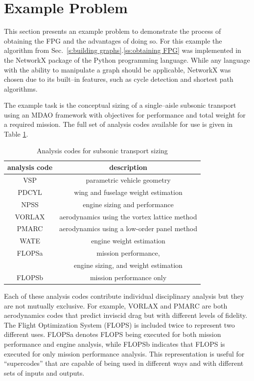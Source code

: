 \section{Example Problem}
	\label{s:example problem}
	This section presents an example problem to demonstrate the process of obtaining the FPG and the advantages of doing so. 
	For this example the algorithm from Sec.~\ref{s:building graphs}.\ref{ss:obtaining FPG} was implemented in the NetworkX package of the Python programming language. 
	While any language with the ability to manipulate a graph should be applicable, NetworkX was chosen due to its built--in features, such as cycle detection and shortest path algorithms.

	The example task is the conceptual sizing of a single--aisle subsonic transport using an MDAO framework with objectives for performance and total weight for a required mission. 
	The full set of analysis codes available for use is given in Table \ref{t:analysis codes}.
	\begin{table}[htbp]
	  \centering
	  \caption{Analysis codes for subsonic transport sizing}
		\begin{tabular}{cc}
		\toprule
		analysis code & description \\
		\midrule
		VSP   & parametric vehicle geometry \\
		PDCYL & wing and fuselage weight estimation \\
		NPSS  & engine sizing and performance \\
		VORLAX & aerodynamics using the vortex lattice method \\
		PMARC & aerodynamics using a low-order panel method \\
		WATE  & engine weight estimation \\
		FLOPSa & mission performance, \\
		  & engine sizing, and weight estimation \\
		FLOPSb & mission performance only \\
		\bottomrule
		\end{tabular}%
	  \label{t:analysis codes}%
	\end{table}%
	Each of these analysis codes contribute individual disciplinary analysis but they are not mutually exclusive. 
	For example, VORLAX and PMARC are both aerodynamics codes that predict inviscid drag but with different levels of fidelity. 
	The Flight Optimization System (FLOPS) is included twice to represent two different uses. 
	FLOPSa denotes FLOPS being executed for both mission performance and engine analysis, while FLOPSb indicates that FLOPS is executed for only mission performance analysis. 
	This representation is useful for ``supercodes'' that are capable of being used in different ways and with different sets of inputs and outputs.

